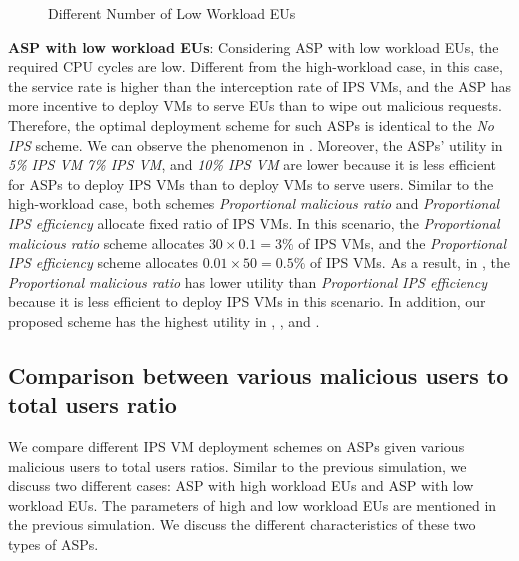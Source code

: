 \documentclass[10pt,journal, compsoc]{IEEEtran}
\begin{document}
\begin{figure}[!]
\captionsetup{justification=centering}
  \hfill
  \hfill
\label{fig:num_cmp_low}
\caption{Different Number of Low Workload EUs}
\end{figure}

\textbf{ASP with low workload EUs}:
Considering ASP with low workload EUs, the required CPU cycles are low. Different from the high-workload case, in this case, the service rate is higher than the interception rate of IPS VMs, and the ASP has more incentive to deploy VMs to serve EUs than to wipe out malicious requests. Therefore, the optimal deployment scheme for such ASPs is identical to the \textit{No IPS} scheme. We can observe the phenomenon in . Moreover, the ASPs' utility in \textit{5\% IPS VM} \textit{7\% IPS VM}, and \textit{10\% IPS VM} are lower because it is less efficient for ASPs to deploy IPS VMs than to deploy VMs to serve users. Similar to the high-workload case, both schemes \textit{Proportional malicious ratio} and \textit{Proportional IPS efficiency} allocate fixed ratio of IPS VMs. In this scenario, the \textit{Proportional malicious ratio} scheme allocates $30 \times 0.1 = 3\%$ of IPS VMs, and the \textit{Proportional IPS efficiency} scheme allocates $0.01 \times 50 = 0.5\%$ of IPS VMs. As a result, in , the \textit{Proportional malicious ratio} has lower utility than \textit{Proportional IPS efficiency} because it is less efficient to deploy IPS VMs in this scenario. In addition, our proposed scheme has the highest utility in , , and .

\subsection{Comparison between various malicious users to total users ratio}\label{subsec:mal}
We compare different IPS VM deployment schemes on ASPs given various malicious users to total users ratios. Similar to the previous simulation, we discuss two different cases: ASP with high workload EUs and ASP with low workload EUs. The parameters of high and low workload EUs are mentioned in the previous simulation. We discuss the different characteristics of these two types of ASPs. 
\end{document}
